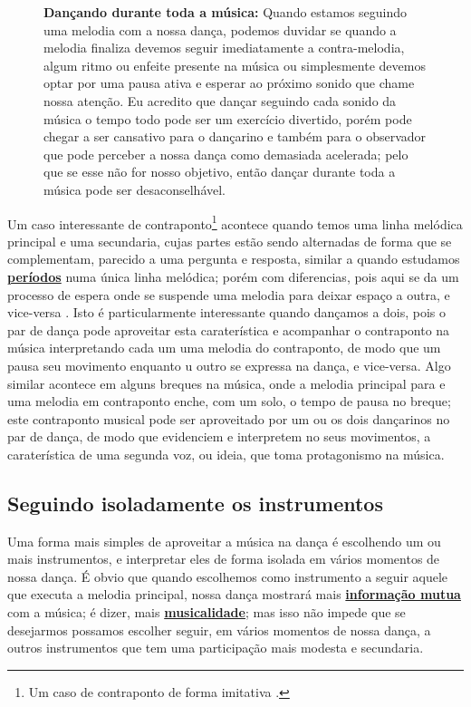 \begin{figure}[!b]
\begin{tcbinformation} 
\textbf{Dançando durante toda a música:}
Quando estamos seguindo uma melodia com a nossa dança,
podemos duvidar se quando a melodia finaliza devemos seguir imediatamente a 
contra-melodia, algum ritmo ou enfeite presente na música ou simplesmente devemos optar por uma 
pausa ativa e esperar ao próximo sonido que chame nossa atenção. 
Eu acredito que dançar seguindo cada sonido da música o tempo todo pode ser um exercício divertido, 
porém pode chegar a ser cansativo para o dançarino 
e também para o observador que pode perceber a nossa dança como demasiada acelerada;
pelo que se esse não for nosso objetivo, então dançar durante toda a música pode ser desaconselhável. 
\end{tcbinformation} 
\end{figure}
Um caso interessante de contraponto\footnote{Um 
caso de contraponto de forma imitativa \cite[pp. 100]{tragtenberg2002contraponto}.}
acontece quando temos uma linha melódica principal e uma secundaria, 
cujas partes estão sendo alternadas de forma que se complementam,
parecido a uma pergunta e resposta, similar a quando estudamos 
\hyperref[sec:Periodo]{\textbf{períodos}} numa única linha melódica;
porém com diferencias, pois aqui se da um processo de espera onde se suspende 
uma melodia para deixar espaço 
a outra, e vice-versa \cite[pp. 100, 111]{tragtenberg2002contraponto}.
Isto é particularmente interessante quando dançamos a dois,
pois o par de dança pode aproveitar esta caraterística 
e acompanhar o contraponto na música interpretando cada um 
uma melodia do contraponto, 
de modo que um pausa seu movimento enquanto u outro se expressa na dança, e vice-versa.
Algo similar acontece em alguns breques na música, onde a melodia principal para 
e uma melodia em contraponto enche, com um solo, o tempo de pausa no breque;
este contraponto musical pode ser aproveitado por um ou os dois dançarinos no par de dança,
de modo que evidenciem e interpretem no seus movimentos, 
a caraterística de uma segunda voz, ou ideia, que toma protagonismo na música.


\subsection{Seguindo isoladamente os instrumentos}
\label{sec:seguindoinstrumentos}
Uma forma mais simples de aproveitar a música na dança é escolhendo um ou mais instrumentos,
e interpretar eles de forma isolada em vários momentos de nossa dança. 
É obvio que quando escolhemos como instrumento a seguir aquele que executa a melodia principal,
nossa dança mostrará mais \hyperref[sec:musicalidadeinfmutua]{\textbf{informação mutua}} com a música; é dizer, 
mais \hyperref[sec:musicalidadeinfmutua]{\textbf{musicalidade}};
mas isso não impede que se desejarmos possamos escolher  
seguir, em vários momentos de nossa dança,
a outros instrumentos que tem uma participação mais modesta e secundaria.

